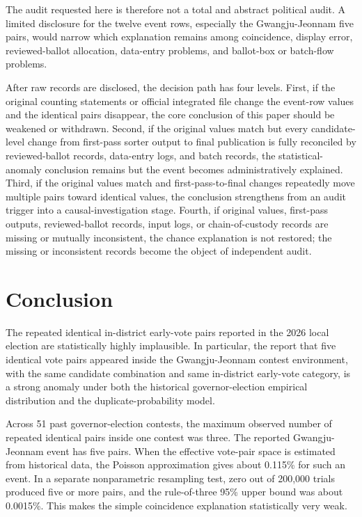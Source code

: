\documentclass[preprint]{../ieie/IEIE}
\begin{document}
The audit requested here is therefore not a total and abstract political audit. A limited disclosure for the twelve event rows, especially the Gwangju-Jeonnam five pairs, would narrow which explanation remains among coincidence, display error, reviewed-ballot allocation, data-entry problems, and ballot-box or batch-flow problems.

After raw records are disclosed, the decision path has four levels. First, if the original counting statements or official integrated file change the event-row values and the identical pairs disappear, the core conclusion of this paper should be weakened or withdrawn. Second, if the original values match but every candidate-level change from first-pass sorter output to final publication is fully reconciled by reviewed-ballot records, data-entry logs, and batch records, the statistical-anomaly conclusion remains but the event becomes administratively explained. Third, if the original values match and first-pass-to-final changes repeatedly move multiple pairs toward identical values, the conclusion strengthens from an audit trigger into a causal-investigation stage. Fourth, if original values, first-pass outputs, reviewed-ballot records, input logs, or chain-of-custody records are missing or mutually inconsistent, the chance explanation is not restored; the missing or inconsistent records become the object of independent audit.

\section{Conclusion}

The repeated identical in-district early-vote pairs reported in the 2026 local election are statistically highly implausible. In particular, the report that five identical vote pairs appeared inside the Gwangju-Jeonnam contest environment, with the same candidate combination and same in-district early-vote category, is a strong anomaly under both the historical governor-election empirical distribution and the duplicate-probability model.

Across 51 past governor-election contests, the maximum observed number of repeated identical pairs inside one contest was three. The reported Gwangju-Jeonnam event has five pairs. When the effective vote-pair space is estimated from historical data, the Poisson approximation gives about 0.115\% for such an event. In a separate nonparametric resampling test, zero out of 200,000 trials produced five or more pairs, and the rule-of-three 95\% upper bound was about 0.0015\%. This makes the simple coincidence explanation statistically very weak.
\end{document}
